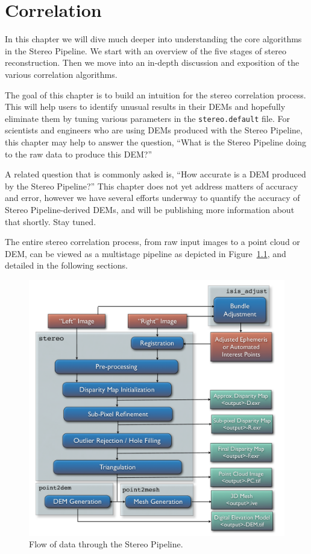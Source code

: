 \chapter{Correlation}
\label{ch:correlation}

In this chapter we will dive much deeper into understanding the core
algorithms in the Stereo Pipeline.  We start with an overview of the
five stages of stereo reconstruction.  Then we move into an in-depth
discussion and exposition of the various correlation algorithms.

The goal of this chapter is to build an intuition for the stereo
correlation process.  This will help users to identify unusual results
in their \acp{DEM} and hopefully eliminate them by tuning various
parameters in the \texttt{stereo.default} file.  For scientists and
engineers who are using \acp{DEM} produced with the Stereo Pipeline, this
chapter may help to answer the question, ``What is the Stereo Pipeline
doing to the raw data to produce this \ac{DEM}?''

A related question that is commonly asked is, ``How accurate is a \ac{DEM}
produced by the Stereo Pipeline?''  This chapter does not yet address
matters of accuracy and error, however we have several efforts underway
to quantify the accuracy of Stereo Pipeline-derived \acp{DEM}, and will be
publishing more information about that shortly.  Stay tuned.

The entire stereo correlation process, from raw input images to a
point cloud or DEM, can be viewed as a multistage pipeline as depicted
in Figure~\ref{fig:asp}, and detailed in the following sections.

\begin{figure}[tb]
  \centering
  \includegraphics[width=13cm]{images/asp}
  \caption{Flow of data through the Stereo Pipeline.}
  \label{fig:asp}
\end{figure}

